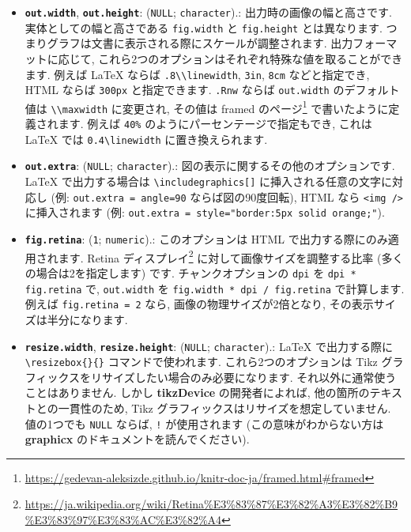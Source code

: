 \documentclass[
  11pt,
  lualatex,ja=standard,jafont=noto]{bxjsreport}
\renewcommand{\href}[2]{#2\footnote{\url{#1}}}
\begin{document}
\begin{itemize}
\item
  \textbf{\texttt{out.width}}, \textbf{\texttt{out.height}}: (\texttt{NULL}; \texttt{character}).: 出力時の画像の幅と高さです. 実体としての幅と高さである \texttt{fig.width} と \texttt{fig.height} とは異なります. つまりグラフは文書に表示される際にスケールが調整されます. 出力フォーマットに応じて, これら2つのオプションはそれぞれ特殊な値を取ることができます. 例えば LaTeX ならば \texttt{.8\textbackslash{}\textbackslash{}linewidth}, \texttt{3in}, \texttt{8cm} などと指定でき, HTML ならば \texttt{300px} と指定できます. \texttt{.Rnw} ならば \texttt{out.width} のデフォルト値は \texttt{\textbackslash{}\textbackslash{}maxwidth} に変更され, その値は \href{https://gedevan-aleksizde.github.io/knitr-doc-ja/framed.html\#framed}{framed のページ} で書いたように定義されます. 例えば \texttt{\textquotesingle{}40\%\textquotesingle{}} のようにパーセンテージで指定もでき, これは LaTeX では \texttt{0.4\textbackslash{}linewidth} に置き換えられます.
\item
  \textbf{\texttt{out.extra}}: (\texttt{NULL}; \texttt{character}).: 図の表示に関するその他のオプションです. LaTeX で出力する場合は \texttt{\textbackslash{}includegraphics{[}{]}} に挿入される任意の文字に対応し (例: \texttt{out.extra = \textquotesingle{}angle=90\textquotesingle{}} ならば図の90度回転), HTML なら \texttt{\textless{}img\ /\textgreater{}} に挿入されます (例: \texttt{out.extra = \textquotesingle{}style="border:5px\ solid\ orange;"\textquotesingle{}}).
\item
  \textbf{\texttt{fig.retina}}: (\texttt{1}; \texttt{numeric}).: このオプションは HTML で出力する際にのみ適用されます. \href{https://ja.wikipedia.org/wiki/Retina\%E3\%83\%87\%E3\%82\%A3\%E3\%82\%B9\%E3\%83\%97\%E3\%83\%AC\%E3\%82\%A4}{Retina ディスプレイ} に対して画像サイズを調整する比率 (多くの場合は2を指定します) です. チャンクオプションの \texttt{dpi} を \texttt{dpi * fig.retina} で, \texttt{out.width} を \texttt{fig.width * dpi / fig.retina} で計算します. 例えば \texttt{fig.retina = 2} なら, 画像の物理サイズが2倍となり, その表示サイズは半分になります.
\item
  \textbf{\texttt{resize.width}}, \textbf{\texttt{resize.height}}: (\texttt{NULL}; \texttt{character}).: LaTeX で出力する際に \texttt{\textbackslash{}resizebox\{\}\{\}} コマンドで使われます. これら2つのオプションは Tikz グラフィックスをリサイズしたい場合のみ必要になります. それ以外に通常使うことはありません. しかし \textbf{tikzDevice} の開発者によれば, 他の箇所のテキストとの一貫性のため, Tikz グラフィックスはリサイズを想定していません. 値の1つでも \texttt{NULL} ならば, \texttt{!} が使用されます (この意味がわからない方は \textbf{graphicx} のドキュメントを読んでください).

\end{itemize}
\end{document}
